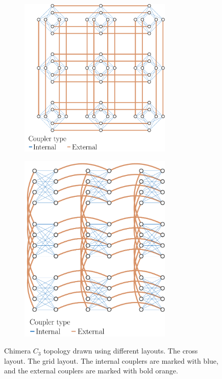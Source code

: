 \begin{figure}
  \begin{subfigure}[b]{0.5\textwidth}
    \centering
    \includegraphics[width=0.8\textwidth]{figures/chimera-cross.pdf}
    \caption{}\label{fig:chimera-cross}
  \end{subfigure}
  \begin{subfigure}[b]{0.45\textwidth}
    \centering
    \includegraphics[width=0.8\textwidth]{figures/chimera-shore-column.pdf}
    \caption{}\label{fig:chimera-shore-column}
  \end{subfigure}
  \caption{
    Chimera $C_3$ topology drawn using different layouts.
     The cross layout. 
    The grid layout. The internal couplers are marked with {\color{RoyalBlue}
      blue}, and the external couplers are marked with bold {\color{Tan} orange}. }
  \label{fig:chimera}
\end{figure}

